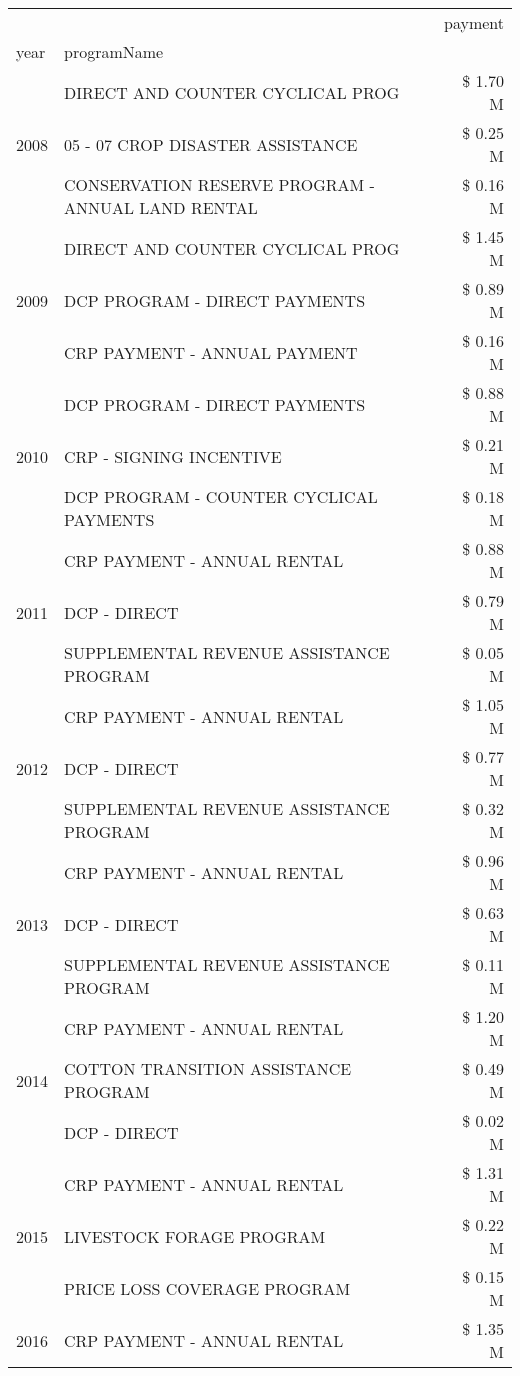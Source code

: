 \begin{tabular}{llr}
\toprule
 &  & payment \\
year & programName &  \\
\midrule
\multirow[t]{3}{*}{2008} & DIRECT AND COUNTER CYCLICAL PROG & \$ 1.70 M \\
 & 05 - 07 CROP DISASTER ASSISTANCE & \$ 0.25 M \\
 & CONSERVATION RESERVE PROGRAM - ANNUAL LAND RENTAL & \$ 0.16 M \\
\cline{1-3}
\multirow[t]{3}{*}{2009} & DIRECT AND COUNTER CYCLICAL PROG & \$ 1.45 M \\
 & DCP PROGRAM - DIRECT PAYMENTS & \$ 0.89 M \\
 & CRP PAYMENT - ANNUAL PAYMENT & \$ 0.16 M \\
\cline{1-3}
\multirow[t]{3}{*}{2010} & DCP PROGRAM - DIRECT PAYMENTS & \$ 0.88 M \\
 & CRP - SIGNING INCENTIVE & \$ 0.21 M \\
 & DCP PROGRAM - COUNTER CYCLICAL PAYMENTS & \$ 0.18 M \\
\cline{1-3}
\multirow[t]{3}{*}{2011} & CRP PAYMENT - ANNUAL RENTAL & \$ 0.88 M \\
 & DCP - DIRECT & \$ 0.79 M \\
 & SUPPLEMENTAL REVENUE ASSISTANCE PROGRAM & \$ 0.05 M \\
\cline{1-3}
\multirow[t]{3}{*}{2012} & CRP PAYMENT - ANNUAL RENTAL & \$ 1.05 M \\
 & DCP - DIRECT & \$ 0.77 M \\
 & SUPPLEMENTAL REVENUE ASSISTANCE PROGRAM & \$ 0.32 M \\
\cline{1-3}
\multirow[t]{3}{*}{2013} & CRP PAYMENT - ANNUAL RENTAL & \$ 0.96 M \\
 & DCP - DIRECT & \$ 0.63 M \\
 & SUPPLEMENTAL REVENUE ASSISTANCE PROGRAM & \$ 0.11 M \\
\cline{1-3}
\multirow[t]{3}{*}{2014} & CRP PAYMENT - ANNUAL RENTAL & \$ 1.20 M \\
 & COTTON TRANSITION ASSISTANCE PROGRAM & \$ 0.49 M \\
 & DCP - DIRECT & \$ 0.02 M \\
\cline{1-3}
\multirow[t]{3}{*}{2015} & CRP PAYMENT - ANNUAL RENTAL & \$ 1.31 M \\
 & LIVESTOCK FORAGE PROGRAM & \$ 0.22 M \\
 & PRICE LOSS COVERAGE PROGRAM & \$ 0.15 M \\
\cline{1-3}
\multirow[t]{3}{*}{2016} & CRP PAYMENT - ANNUAL RENTAL & \$ 1.35 M \\

\end{tabular}
